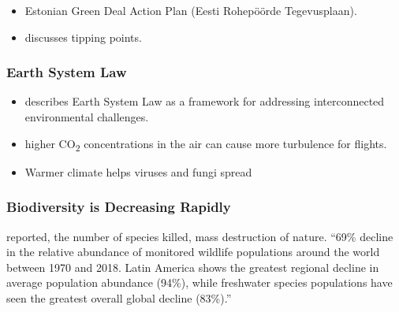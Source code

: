 \documentclass[
  letterpaper,
  DIV=11,
  numbers=noendperiod]{scrartcl}
\providecommand{\tightlist}{%
  \setlength{\itemsep}{0pt}\setlength{\parskip}{0pt}}\usepackage{longtable,booktabs,array}
\begin{document}
\begin{itemize}
\tightlist
\item
  \citet{eestivabariigivalitsusRohepoordeTegevusplaan2022} Estonian
  Green Deal Action Plan (Eesti Rohepöörde Tegevusplaan).
\item
  \citet{armstrongmckayExceedingGlobalWarming2022} discusses tipping
  points.
\end{itemize}

\subsubsection{Earth System Law}\label{earth-system-law}

\begin{itemize}
\item
  \citet{dutoitReimaginingInternationalEnvironmental2022} describes
  Earth System Law as a framework for addressing interconnected
  environmental challenges.
\item
  \citet{williamsIntensificationWinterTransatlantic2013} higher
  CO\textsubscript{2} concentrations in the air can cause more
  turbulence for flights.
\item
  Warmer climate helps viruses and fungi spread
  \citet{pressFungalDiseaseRapidly2023}
\end{itemize}

\subsubsection{Biodiversity is Decreasing
Rapidly}\label{biodiversity-is-decreasing-rapidly}

\citet{livingPlanetReport2022} reported, the number of species killed,
mass destruction of nature. ``69\% decline in the relative abundance of
monitored wildlife populations around the world between 1970 and 2018.
Latin America shows the greatest regional decline in average population
abundance (94\%), while freshwater species populations have seen the
greatest overall global decline (83\%).''
\end{document}
